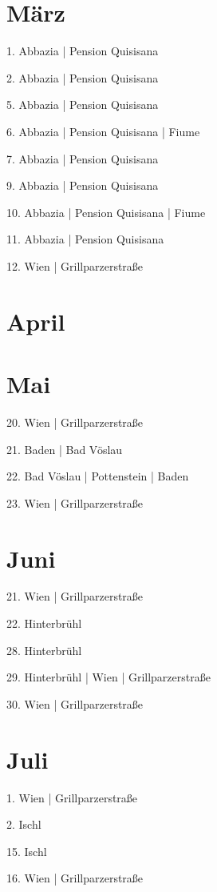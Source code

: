 \documentclass[twoside=false,titlepage=false,open=any, parskip=never, fontsize=10pt, headings=small, chapterprefix=false, appendixprefix=false, DIV=15]{scrbook}
\begin{document}
\begin{multicols}{3}
            \section*{März}
            1. Abbazia | Pension Quisisana\par
            2. Abbazia | Pension Quisisana\par
            5. Abbazia | Pension Quisisana\par
            6. Abbazia | Pension Quisisana | Fiume\par
            7. Abbazia | Pension Quisisana\par
            9. Abbazia | Pension Quisisana\par
            10. Abbazia | Pension Quisisana | Fiume\par
            11. Abbazia | Pension Quisisana\par
            12. Wien | Grillparzerstraße\par
            \section*{April}
            \section*{Mai}
            20. Wien | Grillparzerstraße\par
            21. Baden | Bad Vöslau\par
            22. Bad Vöslau | Pottenstein | Baden\par
            23. Wien | Grillparzerstraße\par
            \section*{Juni}
            21. Wien | Grillparzerstraße\par
            22. Hinterbrühl\par
            28. Hinterbrühl\par
            29. Hinterbrühl | Wien | Grillparzerstraße\par
            30. Wien | Grillparzerstraße\par
            \section*{Juli}
            1. Wien | Grillparzerstraße\par
            2. Ischl\par
            15. Ischl\par
            16. Wien | Grillparzerstraße\par

\end{multicols}
\end{document}
